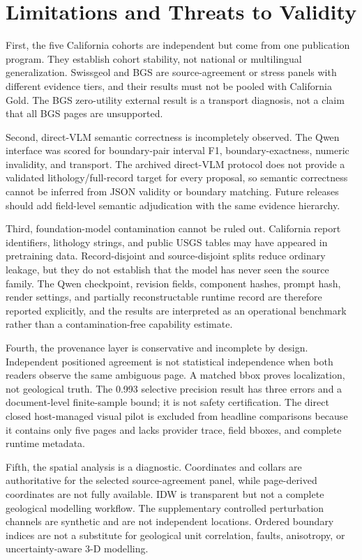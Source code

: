 \documentclass[a4paper,fleqn]{cas-sc}
\begin{document}
\section{Limitations and Threats to Validity}

First, the five California cohorts are independent but come from one publication program. They establish cohort stability, not national or multilingual generalization. Swissgeol and BGS are source-agreement or stress panels with different evidence tiers, and their results must not be pooled with California Gold. The BGS zero-utility external result is a transport diagnosis, not a claim that all BGS pages are unsupported.

Second, direct-VLM semantic correctness is incompletely observed. The Qwen interface was scored for boundary-pair interval F1, boundary-exactness, numeric invalidity, and transport. The archived direct-VLM protocol does not provide a validated lithology/full-record target for every proposal, so semantic correctness cannot be inferred from JSON validity or boundary matching. Future releases should add field-level semantic adjudication with the same evidence hierarchy.

Third, foundation-model contamination cannot be ruled out. California report identifiers, lithology strings, and public USGS tables may have appeared in pretraining data. Record-disjoint and source-disjoint splits reduce ordinary leakage, but they do not establish that the model has never seen the source family. The Qwen checkpoint, revision fields, component hashes, prompt hash, render settings, and partially reconstructable runtime record are therefore reported explicitly, and the results are interpreted as an operational benchmark rather than a contamination-free capability estimate.

Fourth, the provenance layer is conservative and incomplete by design. Independent positioned agreement is not statistical independence when both readers observe the same ambiguous page. A matched bbox proves localization, not geological truth. The 0.993 selective precision result has three errors and a document-level finite-sample bound; it is not safety certification. The direct closed host-managed visual pilot is excluded from headline comparisons because it contains only five pages and lacks provider trace, field bboxes, and complete runtime metadata.

Fifth, the spatial analysis is a diagnostic. Coordinates and collars are authoritative for the selected source-agreement panel, while page-derived coordinates are not fully available. IDW is transparent but not a complete geological modelling workflow. The supplementary controlled perturbation channels are synthetic and are not independent locations. Ordered boundary indices are not a substitute for geological unit correlation, faults, anisotropy, or uncertainty-aware 3-D modelling.
\end{document}
